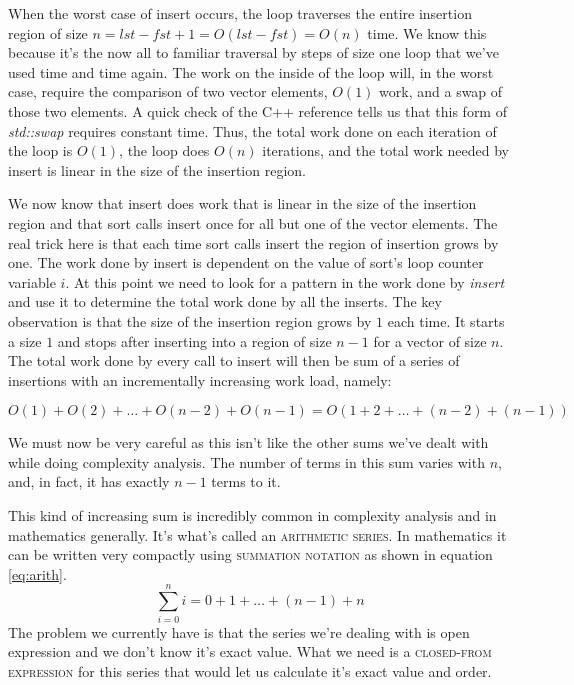 \documentclass[]{tufte-handout}
\begin{document}
When the worst case of insert occurs, the loop traverses the entire insertion region of size $n=lst-fst+1=O(lst-fst)=O(n)$ time. We know this because it's the now all to familiar traversal by steps of size one loop that we've used time and time again. The work on the inside of the loop will, in the worst case, require the comparison of two vector elements, $O(1)$ work, and a swap of those two elements. A quick check of the C++ reference tells us that this form of \textit{std::swap} requires constant time. Thus, the total work done on each iteration of the loop is $O(1)$, the loop does $O(n)$ iterations, and the total work needed by insert is linear in the size of the insertion region.

We now know that insert does work that is linear in the size of the insertion region and that sort calls insert once for all but one of the vector elements. The real trick here is that each time sort calls insert the region of insertion grows by one. The work done by insert is dependent on the value of sort's loop counter variable $i$. At this point we need to look for a pattern in the work done by \textit{insert} and use it to determine the total work done by all the inserts. The key observation is that the size of the insertion region grows by $1$ each time. It starts a size $1$ and stops after inserting into a region of size $n-1$ for a vector of size $n$. The total work done by every call to insert will then be sum of a series of insertions with an incrementally increasing work load, namely:

\[
O(1) + O(2) + \ldots + O(n-2) + O(n-1) = O(1+2+\ldots+(n-2)+(n-1))
\]

We must now be very careful as this isn't like the other sums we've dealt with while doing complexity analysis. The number of terms in this sum varies with $n$, and, in fact, it has exactly $n-1$ terms to it. 

This kind of increasing sum is incredibly common in complexity analysis and in mathematics generally. It's what's called an \textsc{arithmetic series}. In mathematics it can be written very compactly using \textsc{summation notation} as shown in equation \ref{eq:arith}.
\begin{equation}
\sum\limits_{i=0}^{n} i = 0 + 1 + \ldots +(n-1) + n
\label{eq:arith}
\end{equation}
The problem we currently have is that the series we're dealing with is open expression and we don't know it's exact value. What we need is a \textsc{closed-from expression} for this series that would let us calculate it's exact value and order. 
\end{document}
